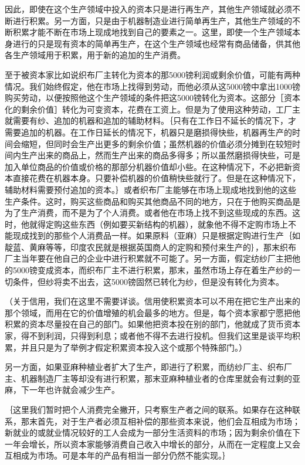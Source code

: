 因此，即使在这个生产领域中投入的资本只是进行再生产，其他生产领域就必须不断进行积累。另一方面，只是由于机器制造业进行简单再生产，其他生产领域的不断积累才能不断在市场上现成地找到自己的要素之一。这里，即使一个生产领域本身进行的只是现有资本的简单再生产，在这个生产领域也经常有商品储备，供其他各生产领域用于积累，用于新的追加的生产消费。

至于被资本家比如说织布厂主转化为资本的那5000镑利润或剩余价值，可能有两种情况。我们始终假定，他在市场上找得到劳动，而他必须从这5000镑中拿出1000镑购买劳动，以便按照他这个生产领域的条件把这5000镑转化为资本。这部分［资本化的剩余价值］转化为可变资本，花费在工资上。但是为了使用这种劳动，工厂主就需要有纱、追加的机器和追加的辅助材料。｛只有在工作日不延长的情况下，才需要追加的机器。在工作日延长的情况下，机器只是磨损得快些，机器再生产的时间会缩短，但同时会生产出更多的剩余价值；虽然机器的价值必须分摊到在较短时间内生产出来的商品上，然而生产出来的商品多得多；所以虽然磨损得快些，可是加入单位商品的价值或价格的那部分机器价值却小些。在这种情况下，不必把新资本直接花费在机器本身。只要补偿机器的价值稍快些就行了。但是在这种情况下，辅助材料需要预付追加的资本。｝或者织布厂主能够在市场上现成地找到他的这些生产条件。这时，购买这些商品和购买其他商品不同的地方，只在于他购买商品是为了生产消费，而不是为了个人消费。或者他在市场上找不到这些现成的东西。这时，他就得定购这些东西（例如要买新结构的机器），就象他不得不定购市场上不能现成找到的那些个人消费品一样。如果原料（亚麻）只是根据定购进行生产｛如靛蓝、黄麻等等，印度农民就是根据英国商人的定购和预付来生产的｝，那末织布厂主当年要在他自己的企业中进行积累就不可能了。另一方面，假定纺纱厂主把他的5000镑变成资本，而织布厂主不进行积累，那末，虽然市场上存在着生产纱的一切条件，但纱将卖不出去，这5000镑固然已转化为纱，但是没有转化为资本。

（关于信用，我们在这里不需要详谈。信用使积累资本可以不用在把它生产出来的那个领域，而用在它的价值增殖的机会最多的地方。但是，每个资本家都宁愿把他积累的资本尽量投在自己的部门。如果他把资本投在别的部门，他就成了货币资本家，得不到利润，只得到利息；或者他不得不去进行投机。但我们这里是谈平均积累，并且只是为了举例才假定积累资本投入这个或那个特殊部门。）

另一方面，如果亚麻种植业者扩大了生产，即进行了积累，而纺纱厂主、织布厂主、机器制造厂主等却没有进行积累，那末亚麻种植业者的仓库里就会有过剩的亚麻，下一年也许就会减少生产。

｛这里我们暂时把个人消费完全撇开，只考察生产者之间的联系。如果存在这种联系，那末首先，对于生产者必须互相补偿的那些资本来说，他们会互相成为市场；新就业的或就业情况较好的工人会成为一部分生活资料的市场；因为剩余价值在下一年会增长，所以资本家能够消费自己收入中增长的部分，从而在一定程度上又会互相成为市场。可是本年的产品有相当一部分仍然不能实现。｝

